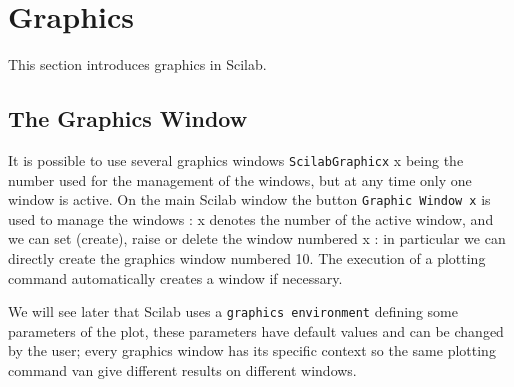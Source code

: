 \chapter{Graphics}
This section introduces graphics in Scilab. 

\section{The Graphics Window}
It is possible to use several graphics windows {\tt ScilabGraphicx} x being
the number used for the management of the windows, but at any time only
one window is active. On the main Scilab window the button
 {\tt Graphic Window x} is used to manage the windows : x denotes the
number of the active window, and we can set (create), raise or delete 
the window numbered x : in particular we can directly create the 
graphics window numbered 10.
The execution of a plotting command automatically creates a window if 
necessary.

We will see later that Scilab uses a {\tt graphics environment}
defining some parameters of the plot, these parameters have default
values and can be changed by the user; every graphics window has its
specific context so the same plotting command van give different
results on different windows.


